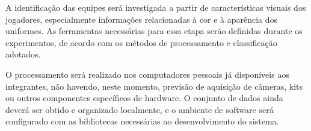 A identificação das equipes será investigada a partir de características visuais dos jogadores, especialmente informações relacionadas à cor e à aparência dos uniformes. As ferramentas necessárias para essa etapa serão definidas durante os experimentos, de acordo com os métodos de processamento e classificação adotados.

O processamento será realizado nos computadores pessoais já disponíveis aos integrantes, não havendo, neste momento, previsão de aquisição de câmeras, kits ou outros componentes específicos de hardware. O conjunto de dados ainda deverá ser obtido e organizado localmente, e o ambiente de software será configurado com as bibliotecas necessárias ao desenvolvimento do sistema.